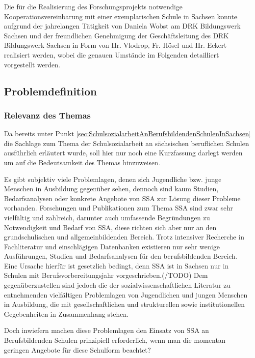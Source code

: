 Die für die Realisierung des Forschungsprojekts notwendige Kooperationsvereinbarung mit einer exemplarischen Schule in Sachsen konnte aufgrund der jahrelangen Tätigkeit von Daniela Wobst am DRK Bildungswerk Sachsen und der freundlichen Genehmigung der Geschäftsleitung des DRK Bildungswerk Sachsen in Form von Hr. Vlodrop, Fr. Hösel und Hr. Eckert realisiert werden, wobei die genauen Umstände im Folgenden detailliert vorgestellt werden.

\subsection{Problemdefinition}
\label{sec:Problemdefinition}

\subsubsection{Relevanz des Themas}
\label{sec:RelevanzDesThemas}

Da bereits unter Punkt \ref{sec:SchulsozialarbeitAnBerufsbildendenSchulenInSachsen} die Sachlage zum Thema der Schulsozialarbeit an sächsischen beruflichen Schulen ausführlich erläutert wurde, soll hier nur noch eine Kurzfassung darlegt werden um auf die Bedeutsamkeit des Themas hinzuweisen.

Es gibt subjektiv viele Problemlagen, denen sich Jugendliche bzw. junge Menschen in Ausbildung gegenüber sehen, dennoch sind kaum Studien, Bedarfsanalysen oder konkrete Angebote von SSA zur Lösung dieser Probleme vorhanden. Forschungen und Publikationen zum Thema SSA sind zwar sehr vielfältig und zahlreich, darunter auch umfassende Begründungen zu Notwendigkeit und Bedarf von SSA, diese richten sich aber nur an den grundschulischen und allgemeinbildenden Bereich. Trotz intensiver Recherche in Fachliteratur und einschlägigen Datenbanken existieren nur sehr wenige Ausführungen, Studien und Bedarfsanalysen für den berufsbildenden Bereich. Eine Ursache hierfür ist gesetzlich bedingt, denn SSA ist in Sachsen nur in Schulen mit Berufsvorbereitungsjahr vorgeschrieben.(/TODO) Dem gegenüberzustellen sind jedoch die der sozialwissenschaftlichen Literatur zu entnehmenden vielfältigen Problemlagen von Jugendlichen und jungen Menschen in Ausbildung, die mit gesellschaftlichen und strukturellen sowie institutionellen Gegebenheiten in Zusammenhang stehen. 

Doch inwiefern machen diese Problemlagen den Einsatz von SSA an Berufsbildenden Schulen prinzipiell erforderlich, wenn man die momentan geringen Angebote für diese Schulform beachtet? 

